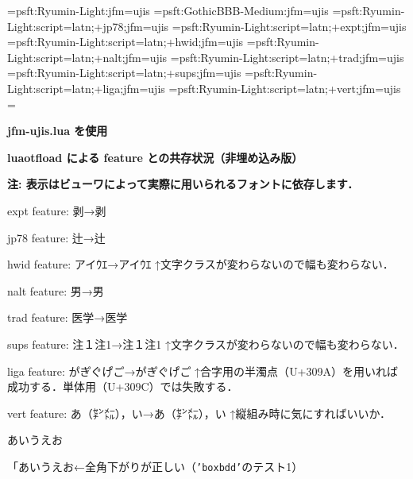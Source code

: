 

\jfont\tenmin={psft:Ryumin-Light:jfm=ujis}\tenmin
\jfont\tengoth={psft:GothicBBB-Medium:jfm=ujis}
\jfont\jisse={psft:Ryumin-Light:script=latn;+jp78;jfm=ujis}
\jfont\jisexpt={psft:Ryumin-Light:script=latn;+expt;jfm=ujis}
\jfont\jishwid={psft:Ryumin-Light:script=latn;+hwid;jfm=ujis}
\jfont\jisnalt={psft:Ryumin-Light:script=latn;+nalt;jfm=ujis}
\jfont\jistrad={psft:Ryumin-Light:script=latn;+trad;jfm=ujis}
\jfont\jissups={psft:Ryumin-Light:script=latn;+sups;jfm=ujis}
\jfont\jisliga={psft:Ryumin-Light:script=latn;+liga;jfm=ujis}
\jfont\jisvert={psft:Ryumin-Light:script=latn;+vert;jfm=ujis}
\parskip=\smallskipamount{}\zw

{\noindent\bf\tengoth jfm-ujis.lua を使用}

\bigskip

{\noindent\bf\tengoth luaotf\/load による feature との共存状況（非埋め込み版）}

{\noindent\bf\tengoth 注: 表示はビューワによって実際に用いられるフォントに依存します．}

{\tentt expt} feature: 剥→{\jisexpt 剥}

{\tentt jp78} feature: 辻→{\jisse 辻}

{\tentt hwid} feature: アイｳｴ→{\jishwid アイｳｴ}\hfil\break
↑文字クラスが変わらないので幅も変わらない．

{\tentt nalt} feature: 男→{\jisnalt 男}

{\tentt trad} feature: 医学→{\jistrad 医学}

{\tentt sups} feature: 注１注1→{\jissups 注１注1}\hfil\break
↑文字クラスが変わらないので幅も変わらない．

{\tentt liga} feature: か゚き゚く゚け゚こ゚→{\jisliga か゚き゚く゚け゚こ゚}\hfil\break
↑合字用の半濁点（{\tentt U+309A}）を用いれば成功する．単体用（{\tentt U+309C}）では失敗する．%

{\tentt vert} feature: あ（㌢㍍），い→{\jisvert あ（㌢㍍），い}\hfil\break
↑縦組み時に気にすればいいか．

\bigskip

\noindent あいうえお

「あいうえお←全角下がりが正しい（{\tt'boxbdd'}のテスト1）

